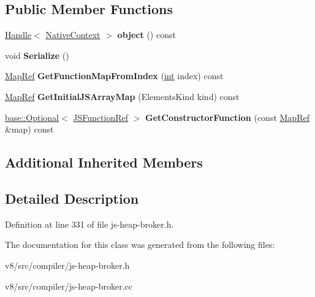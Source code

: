 \subsection*{Public Member Functions}
\begin{DoxyCompactItemize}
\item 
\mbox{\label{classv8_1_1internal_1_1compiler_1_1NativeContextRef_a88f2f2b95f25aed344a747d6a288d18c}} 
\mbox{\hyperlink{classv8_1_1internal_1_1Handle}{Handle}}$<$ \mbox{\hyperlink{classv8_1_1internal_1_1NativeContext}{Native\+Context}} $>$ {\bfseries object} () const
\item 
\mbox{\label{classv8_1_1internal_1_1compiler_1_1NativeContextRef_ac1414d8203f432265d60ad1901dd6fbf}} 
void {\bfseries Serialize} ()
\item 
\mbox{\label{classv8_1_1internal_1_1compiler_1_1NativeContextRef_a433fa6febca93d99767b8308bd62fa91}} 
\mbox{\hyperlink{classv8_1_1internal_1_1compiler_1_1MapRef}{Map\+Ref}} {\bfseries Get\+Function\+Map\+From\+Index} (\mbox{\hyperlink{classint}{int}} index) const
\item 
\mbox{\label{classv8_1_1internal_1_1compiler_1_1NativeContextRef_aeac86acb0b635de1ebc4a541054c416c}} 
\mbox{\hyperlink{classv8_1_1internal_1_1compiler_1_1MapRef}{Map\+Ref}} {\bfseries Get\+Initial\+J\+S\+Array\+Map} (Elements\+Kind kind) const
\item 
\mbox{\label{classv8_1_1internal_1_1compiler_1_1NativeContextRef_af0cab66f4e118900316aba4694e84deb}} 
\mbox{\hyperlink{classv8_1_1base_1_1Optional}{base\+::\+Optional}}$<$ \mbox{\hyperlink{classv8_1_1internal_1_1compiler_1_1JSFunctionRef}{J\+S\+Function\+Ref}} $>$ {\bfseries Get\+Constructor\+Function} (const \mbox{\hyperlink{classv8_1_1internal_1_1compiler_1_1MapRef}{Map\+Ref}} \&map) const
\end{DoxyCompactItemize}
\subsection*{Additional Inherited Members}


\subsection{Detailed Description}


Definition at line 331 of file js-\/heap-\/broker.\+h.



The documentation for this class was generated from the following files\+:\begin{DoxyCompactItemize}
\item 
v8/src/compiler/js-\/heap-\/broker.\+h\item 
v8/src/compiler/js-\/heap-\/broker.\+cc\end{DoxyCompactItemize}
